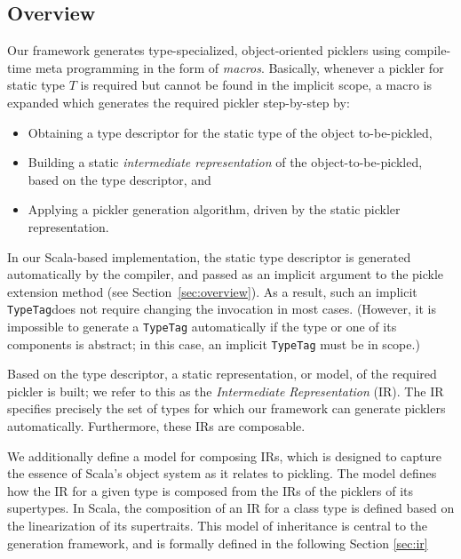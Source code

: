 \documentclass[preprint,10pt]{sigplanconf}
\theoremstyle{definition}
\theoremstyle{definition}
\newcommand{\term}[1]{\mbox{\texttt{#1}}}
\begin{document}

\subsection{Overview}

Our framework generates type-specialized, object-oriented picklers using
compile-time meta programming in the form of {\em macros}. Basically, whenever
a pickler for static type $T$ is required but cannot be found in the implicit
scope, a macro is expanded which generates the required pickler step-by-step
by:

\begin{itemize}
\item Obtaining a type descriptor for the static type of the object to-be-pickled,

\item Building a static {\em intermediate representation} of the object-to-be-pickled,
based on the type descriptor, and

\item Applying a pickler generation algorithm, driven by the static pickler
representation.
\end{itemize}

In our Scala-based implementation, the static type descriptor is generated
automatically by the compiler, and passed as an implicit argument to the
pickle extension method (see Section~\ref{sec:overview}). As a result, such an
implicit \term{TypeTag}\footnotemark[2] does not require changing the invocation in most cases.
(However, it is impossible to generate a \term{TypeTag} automatically if the
type or one of its components is abstract; in this case, an implicit
\term{TypeTag} must be in scope.)

Based on the type descriptor, a static representation, or model, of the
required pickler is built; we refer to this as the {\em Intermediate
Representation} (IR). The IR specifies precisely the set of types for which
our framework can generate picklers automatically. Furthermore, these IRs are composable.

We additionally define a model for composing IRs, which is designed to capture
the essence of Scala's object system as it relates to pickling. The model
defines how the IR for a given type is composed from the IRs of the picklers
of its supertypes. In Scala, the composition of an IR for a class type is
defined based on the linearization of its supertraits. \footnotemark[3]
This model of inheritance is central to the generation framework, and is
formally defined in the following Section \ref{sec:ir}
\end{document}
